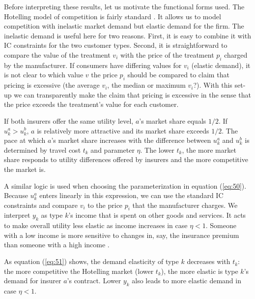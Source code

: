 \documentclass[12pt,english,a4paper]{article}
\begin{document}
Before interpreting these results, let us motivate the functional forms used. The Hotelling model of competition is fairly standard \citep{Tirole}. It allows us to model competition with inelastic market demand but elastic demand for the firm. The inelastic demand is useful here for two reasons. First, it is easy to combine it with IC constraints for the two customer types. Second, it is straightforward to compare the value of the treatment \(v_i\) with the price of the treatment \(p_i\) charged by the manufacturer. If consumers have differing values for \(v_i\) (elastic demand), it is not clear to which value \(v\) the price \(p_i\) should be compared to claim that pricing is excessive (the average \(v_{i}\), the median or maximum \(v_i\)?). With this set-up we can transparently make the claim that pricing is excessive in the sense that the price exceeds the treatment's value for each customer.

If both insurers offer the same utility level, \(a\)'s market share equals \(1/2\). If \(u^a_k > u^b_k\), \(a\) is relatively more attractive and its market share exceeds \(1/2\). The pace at which \(a\)'s market share increases with the difference between \(u_k^a\) and \(u_k^b\) is determined by travel cost \(t_k\) and parameter \(\eta\). The lower \(t_k\), the more market share responds to utility differences offered by insurers and the more competitive the market is.

A similar logic is used when choosing the parameterization in equation (\ref{eq:50}). Because \(u_k^a\) enters linearly in this expression, we can use the standard IC constraints and compare \(v_i\) to the price \(p_i\) that the manufacturer charges. We interpret \(y_k\) as type \(k\)'s income that is spent on other goods and services. It acts to make overall utility less elastic as income increases in case \(\eta<1\). Someone with a low income is more sensitive to changes in, say, the insurance premium than someone with a high income \citep{hogan2017}.

As equation (\ref{eq:51}) shows, the demand elasticity of type \(k\) decreases with \(t_k\): the more competitive the Hotelling market (lower \(t_k\)), the more elastic is type \(k\)'s demand for insurer \(a\)'s contract. Lower \(y_k\) also leads to more elastic demand in case \(\eta<1\).
\end{document}
